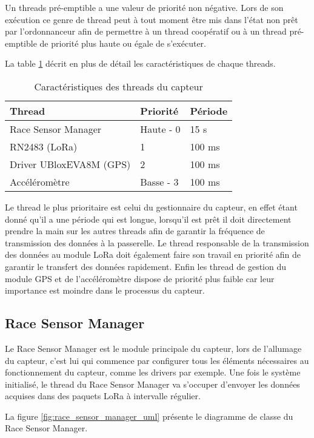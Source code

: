 Un threads pré-emptible a une valeur de priorité non négative. Lors de son exécution ce genre de thread peut à tout moment être mis dans l'état non prêt par l'ordonnanceur afin de permettre à un thread coopératif ou à un thread pré-emptible de priorité plus haute ou égale de s'exécuter. \cite{zephyr_web}

La table \ref{tab:threads_cara} décrit en plus de détail les caractéristiques de chaque threads.

\begin{table}[htb]
\caption{Caractéristiques des threads du capteur}
\label{tab:threads_cara}
\centering
\begin{tabular}{ l l l }
\toprule
Thread & Priorité & Période \\
\midrule
Race Sensor Manager & Haute - 0 & 15 s  \\
RN2483 (LoRa) & 1 & 100 ms  \\
Driver UBloxEVA8M (GPS) & 2 & 100 ms  \\
Accéléromètre & Basse - 3 & 100 ms  \\
\bottomrule 
\end{tabular}
\end{table}

Le thread le plus prioritaire est celui du gestionnaire du capteur, en effet étant donné qu'il a une période qui est longue, lorsqu'il est prêt il doit directement prendre la main sur les autres threads afin de garantir la fréquence de transmission des données à la passerelle.
Le thread responsable de la transmission des données au module LoRa doit également faire son travail en priorité afin de garantir le transfert des données rapidement.
Enfin les thread de gestion du module GPS et de l'accéléromètre dispose de priorité plus faible car leur importance est moindre dans le processus du capteur.

\subsection{Race Sensor Manager}

Le Race Sensor Manager est le module principale du capteur, lors de l'allumage du capteur, c'est lui qui commence par configurer tous les éléments nécessaires au fonctionnement du capteur, comme les drivers par exemple. Une fois le système initialisé, le thread du Race Sensor Manager va s'occuper d'envoyer les données acquises dans des paquets LoRa à intervalle régulier.

La figure \ref{fig:race_sensor_manager_uml} présente le diagramme de classe du Race Sensor Manager.

